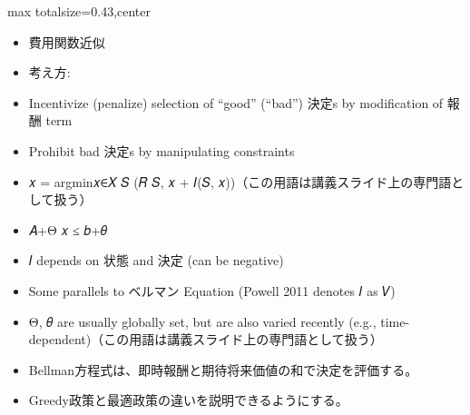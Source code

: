 \clearpage
{}
\begin{minipage}[t]{0.405\textwidth}
\begin{adjustbox}{max totalsize={\textwidth}{0.43\textheight},center}
\begin{minipage}{\textwidth}\scriptsize
{}\begin{itemize}
\item 費用関数近似
\item 考え方:
\item Incentivize (penalize) selection of “good” (“bad”) 決定s by modification of 報酬 term
\item Prohibit bad 決定s by manipulating constraints
\item 𝑥 = argmin𝑥∈𝑋 𝑆 (𝑅 𝑆, 𝑥 + 𝐼(𝑆, 𝑥))（この用語は講義スライド上の専門語として扱う）
\item 𝐴+Θ 𝑥 ≤ 𝑏+𝜃
\item 𝐼 depends on 状態 and 決定 (can be negative)
\item Some parallels to ベルマン Equation (Powell 2011 denotes 𝐼 as 𝑉)
\item Θ, 𝜃 are usually globally set, but are also varied recently (e.g., time-dependent)（この用語は講義スライド上の専門語として扱う）
\end{itemize}\begin{itemize}
\item Bellman方程式は、即時報酬と期待将来価値の和で決定を評価する。
\item Greedy政策と最適政策の違いを説明できるようにする。
\end{itemize}
\end{minipage}
\end{adjustbox}
\end{minipage}\hfill
